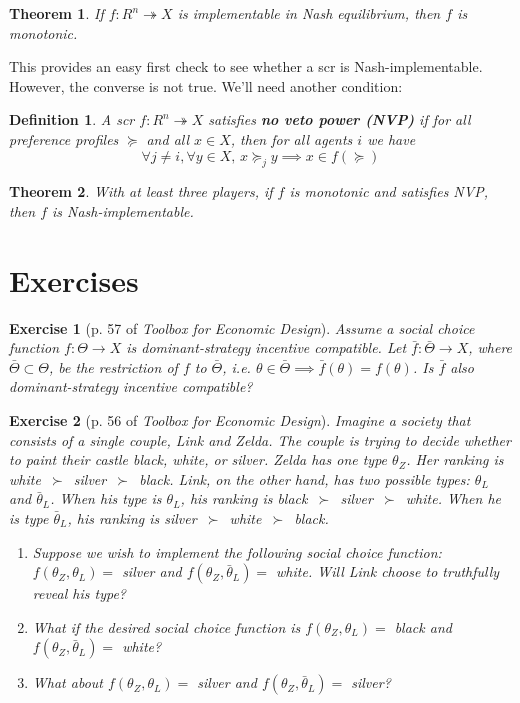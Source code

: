 \documentclass[letter, 10pt]{article}
\theoremstyle{basic}
\newtheorem{exercise}{Exercise}[section]
\newtheorem{definition}{Definition}[section]
\newtheorem{theorem}{Theorem}[section]
\begin{document}
\begin{spacing}{1.0}
\begin{theorem}
  If $f: R^n \twoheadrightarrow X$ is implementable in
  Nash equilibrium, then $f$ is monotonic.
\end{theorem}

This provides an easy first check to see whether a scr is
Nash-implementable. However, the converse is not
true. We'll need another condition:

\begin{definition}
  A scr $f: R^n \twoheadrightarrow X$ satisfies
  \textbf{no veto power (NVP)} if for all preference
  profiles $\succeq$ and all $x\in X$, then for all agents
  $i$ we have \[\forall j \neq i, \forall y\in X, \, x \succeq_j
  y \implies x\in f(\succeq)\]
\end{definition}

\begin{theorem}
  With at least three players, if $f$ is monotonic and
  satisfies NVP, then $f$ is Nash-implementable.
\end{theorem}

\newpage
\section{Exercises}
\label{sec:exercises}

\begin{exercise}[p. 57 of \textit{Toolbox for Economic Design}]
  Assume a social choice function $f: \Theta \to X$ is
  dominant-strategy incentive compatible. Let $\bar{f}: \bar{\Theta} \to
  X$, where $\bar{\Theta} \subset \Theta$, be the restriction of $f$ to
  $\bar{\Theta}$, i.e. $\theta \in \bar{\Theta} \implies \bar{f}(\theta) =
  f(\theta)$. Is $\bar{f}$ also dominant-strategy incentive compatible?
\end{exercise}

\begin{exercise}[p. 56 of \textit{Toolbox for Economic Design}]
  Imagine a society that consists of a single couple, Link and Zelda. The
  couple is trying to decide whether to paint their castle black, white, or
  silver. Zelda has one type $\theta_Z$. Her ranking is
  white~$\succ$~silver~$\succ$~black. Link, on the other hand, has two
  possible types: $\theta_L$ and $\bar{\theta}_L$. When his type is
  $\theta_L$, his ranking is black~$\succ$~silver~$\succ$~white. When he is
  type $\bar{\theta}_L$, his ranking is
  silver~$\succ$~white~$\succ$~black.
  \begin{enumerate}
  \item Suppose we wish to implement the following social choice function:
    $f(\theta_Z, \theta_L) =$ silver and $f(\theta_Z, \bar{\theta}_L) =$
    white. Will Link choose to truthfully reveal his type?
  \item What if the desired social choice function is
    $f(\theta_Z, \theta_L) =$ black and $f(\theta_Z,
    \bar{\theta}_L) =$ white?
  \item What about  $f(\theta_Z, \theta_L) =$ silver and $f(\theta_Z,
  \bar{\theta}_L) =$ silver?
  \end{enumerate}
\end{exercise}


\end{spacing}
\end{document}

